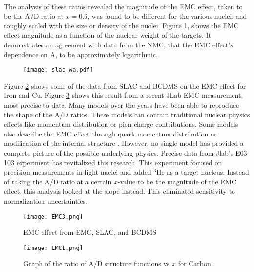 \paragraph{} The analysis of these ratios revealed the magnitude of the EMC effect, taken to be the A/D ratio at $x=0.6$, was found to be different for the various nuclei, and roughly scaled with the size or density of the nuclei. Figure \ref{gomez_wa}, shows the EMC effect magnitude as a function of the nuclear weight of the targets. It demonstrates an agreement with data from the NMC, that the EMC effect's dependence on A, to be approximately logarithmic. 
\begin{figure}[h]
	\centering
	\caption{ \cite{gomez}}
	\label{gomez_wa}
	\texttt{[image: slac\_wa.pdf]} 
\end{figure} 

Figure \ref{EMC3} shows some of the data from SLAC and BCDMS on the EMC effect for Iron and Cu. Figure \ref{EMC 1} shows this result from a recent JLab EMC measurement, most precise to date. Many models over the years have been able to reproduce the shape of the A/D ratios. These models can contain traditional nuclear physics effects like momentum distribution or pion-charge contributions. Some models also describe the EMC effect through quark momentum distribution or modification of the internal structure \cite{Norton, piler, arri, DF, gomez}. However, no single model has provided a complete picture of the possible underlying physics. Precise data from Jlab's E03-103 experiment has revitalized this research. This experiment focused on precision measurements in light nuclei and added $^{3}$He as a target nucleus. Instead of taking the A/D ratio at a certain $x$-value to be the magnitude of the EMC effect, this analysis looked at the slope instead. This eliminated sensitivity to normalization uncertainties. 
\begin{figure}[h]
\centering
\caption{EMC effect from EMC, SLAC, and BCDMS \cite{Norton}}
\label{EMC3}
\centering
\texttt{[image: EMC3.png]}
\end{figure}

\begin{figure}[h]
\centering
 \caption{ Graph of the ratio of A/D structure functions vs $x$ for Carbon \cite{CC}.}
 \label{EMC 1}
 \texttt{[image: EMC1.png]} 
 \end{figure} 
 

